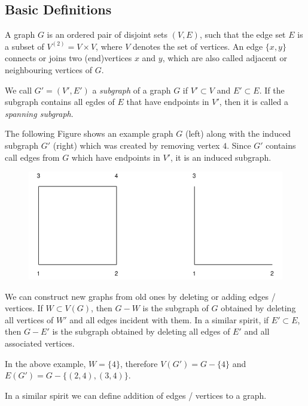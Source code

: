 
\subsection{Basic Definitions}

A graph $G$ is an ordered pair of disjoint sets $(V,E)$, such that the edge set $E$ is a subset of $V^{(2)} = V \times V$, where $V$ denotes the set of vertices. An edge $\{x,y\}$ connects or joins two (end)vertices $x$ and $y$, which are also called adjacent or neighbouring vertices of $G$.

We call $G' = (V', E')$ a \emph{subgraph} of a graph $G$ if $V' \subset V$ and $E' \subset E$. If the subgraph contains all egdes of $E$ that have endpoints in $V'$, then it is called a \emph{spanning subgraph}.

The following Figure shows an example graph $G$ (left) along with the induced subgraph $G'$ (right) which was created by removing vertex $4$. Since $G'$ contains call edges from $G$ which have endpoints in $V'$, it is an induced subgraph.

\begin{figure}[H]
\centering
\includegraphics[scale=0.5]{images/graphs_03_01.png}
\end{figure}

We can construct new graphs from old ones by deleting or adding edges / vertices. If $W \subset V(G)$, then $G - W$ is the subgraph of $G$ obtained by deleting all vertices of $W'$ and all edges incident with them. In a similar spirit, if $E' \subset E$, then $G - E'$ is the subgraph obtained by deleting all edges of $E'$ and all associated vertices.

In the above example, $W = \{4\}$, therefore $V(G') = G - \{4\}$ and $E(G') = G - \{(2,4), (3,4)\}$.

In a similar spirit we can define addition of edges / vertices to a graph.

